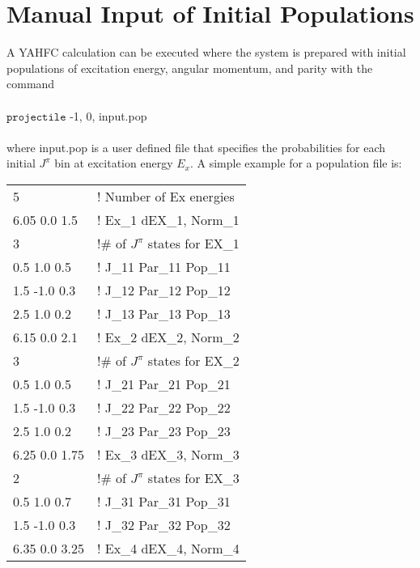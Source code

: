 \documentclass[
10pt,
showpacs,preprintnumbers,footinbib,
amsfonts,amsmath,amssymb,
aps,
prc,twocolumn,groupedaddress,superscriptaddress,
showkeys,
nofootinbib
]{revtex4-1}
\begin{document}
\section{Manual Input of Initial Populations}
\label{App:Populations}
A YAHFC calculation can be executed where the system is prepared with initial populations of excitation energy, angular momentum, and parity with the command \\
\\
${\texttt{projectile}}$ -1, 0, input.pop\\
\\
where input.pop is a user defined file that specifies the probabilities for each initial $J^\pi$ bin at excitation energy $E_x$. A simple example for a population file is:
\begin{center}
\begin{tabular}{| p{3 cm} p{5 cm}|}
\hline
   5                     &                 !   Number of Ex energies\\
  6.05  0.0  1.5         &               ! Ex\_1  dEX\_1, Norm\_1 \\
   3                      &               !\# of $J^\pi$ states for EX\_1\\
  0.5  1.0  0.5      &               ! J\_11  Par\_11 Pop\_11\\
  1.5  -1.0  0.3      &               ! J\_12  Par\_12 Pop\_12\\
  2.5  1.0  0.2      &               ! J\_13  Par\_13 Pop\_13\\
  6.15  0.0  2.1         &               ! Ex\_2  dEX\_2, Norm\_2 \\
   3                     &               !\# of $J^\pi$ states for EX\_2\\
  0.5  1.0  0.5      &               ! J\_21  Par\_21 Pop\_21\\
  1.5  -1.0  0.3      &               ! J\_22  Par\_22 Pop\_22\\
  2.5  1.0  0.2      &               ! J\_23  Par\_23 Pop\_23\\
  6.25  0.0  1.75          &               ! Ex\_3  dEX\_3, Norm\_3 \\
   2                     &               !\# of $J^\pi$ states for EX\_3\\
  0.5  1.0  0.7      &               ! J\_31  Par\_31 Pop\_31\\
  1.5  -1.0  0.3      &               ! J\_32  Par\_32 Pop\_32\\
  6.35  0.0  3.25        &               ! Ex\_4  dEX\_4, Norm\_4 \\

\end{tabular}
\end{center}
\end{document}
